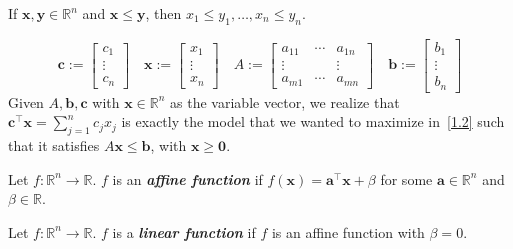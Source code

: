 \begin{remark}
    If $\bm{x},\bm{y}\in\mathbb{R}^n$ and $\bm{x}\leqslant \bm{y}$, then
    $x_1\leqslant  y_1, \ldots, x_n\leqslant y_n$.
\end{remark}

\begin{remark}
    \[
        \bm{c}:=\left[\begin{array}{c}{c_{1}} \\ {\vdots} \\ {c_{n}}\end{array}\right]\quad
        \bm{x}:=\left[\begin{array}{c}{x_{1}} \\ {\vdots} \\ {x_{n}}\end{array}\right]\quad
        A:=\left[\begin{array}{cccc}
                {a_{11}}  & \cdots & {a_{1 n}} \\
                \vdots    &        & \vdots    \\
                {a_{m 1}} & \cdots & {a_{m n}}
            \end{array}\right]\quad
        \bm{b}:=\left[\begin{array}{c}{b_{1}} \\ {\vdots} \\ {b_{n}}\end{array}\right]
    \]
    Given $A,\bm{b},\bm{c}$ with $\bm{x}\in\mathbb{R}^n$ as the variable vector, we realize that
    $\bm{c}^\top  \bm{x}=\sum\limits_{j=1}^n c_j x_j$ is exactly the model that we wanted to maximize
    in~\ref{1.2} such that it satisfies $A\bm{x}\leqslant \bm{b}$, with $\bm{x}\geqslant  \bm{0}$.
\end{remark}

\begin{defbox}
    \begin{definition}
        Let $f:\mathbb{R}^n\rightarrow\mathbb{R}$. $f$ is an \textbf{\emph{affine function}} if
        $f(\bm{x})=\bm{a}^\top \bm{x}+\beta$ for some $\bm{a}\in\mathbb{R}^n$ and $\beta\in\mathbb{R}$.
    \end{definition}
\end{defbox}

\begin{defbox}
    \begin{definition}
        Let $f:\mathbb{R}^n\rightarrow\mathbb{R}$. $f$ is a \textbf{\emph{linear function}} if
        $f$ is an affine function with $\beta=0$.
    \end{definition}
\end{defbox}

